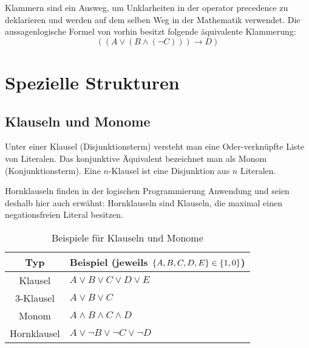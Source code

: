 Klammern sind ein Ausweg, um Unklarheiten in der operator precedence zu deklarieren und werden auf dem selben Weg in der Mathematik verwendet.
Die aussagenlogische Formel von vorhin besitzt folgende äquivalente Klammerung:
%
\begin{equation}
  ((A \lor (B \land (\neg C))) \rightarrow D)
\end{equation}
%
\section{Spezielle Strukturen}
%
\subsection{Klauseln und Monome}
%
Unter einer Klausel (Disjunktionsterm) versteht man eine Oder-verknüpfte Liste von Literalen. Das konjunktive Äquivalent bezeichnet man als Monom (Konjunktionsterm). Eine $n$-Klausel ist eine Disjunktion aus $n$ Literalen.

Hornklauseln finden in der logischen Programmierung Anwendung und seien deshalb hier auch erwähnt: Hornklauseln sind Klauseln, die maximal einen negationsfreien Literal besitzen.
%
\begin{table}[ht]
 \begin{center}
  \begin{tabular}{cl}
   \hline
    Typ         & Beispiel (jeweils $\left\{A, B, C, D, E\right\} \in \left\{1, 0\right\}$) \\
   \hline \hline
    Klausel     & $A \lor B \lor C \lor D \lor E$ \\
    3-Klausel   & $A \lor B \lor C$ \\
    Monom       & $A \land B \land C \land D$ \\
    Hornklausel & $A \lor \neg B \lor \neg C \lor \neg D$ \\
   \hline
  \end{tabular}
  \caption{Beispiele für Klauseln und Monome}
  \label{fig:clauses_monoms}
 \end{center}
\end{table}
%
